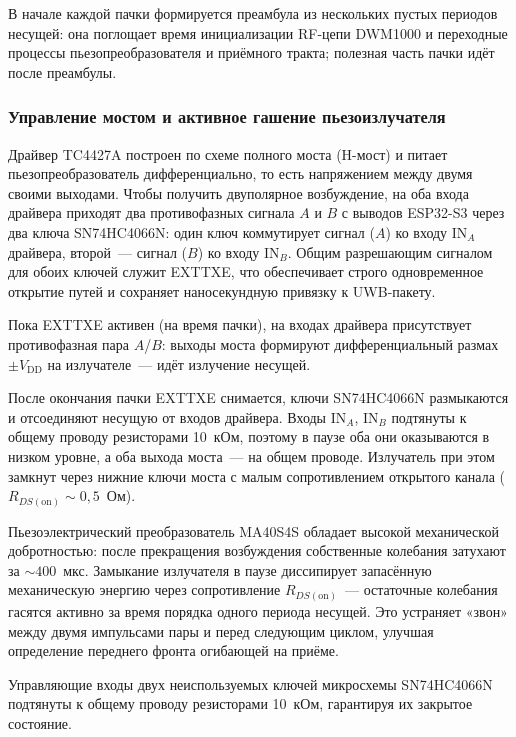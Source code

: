 В начале каждой пачки формируется преамбула из нескольких пустых периодов несущей:
она поглощает время инициализации RF-цепи DWM1000 и переходные процессы
пьезопреобразователя и приёмного тракта; полезная часть пачки идёт после преамбулы.

\subsubsection{Управление мостом и активное гашение пьезоизлучателя}

Драйвер TC4427A построен по схеме полного моста (H-мост) и питает пьезопреобразователь
дифференциально, то есть напряжением между двумя своими выходами. Чтобы получить
двуполярное возбуждение, на оба входа драйвера приходят два противофазных сигнала $A$ и $B$
с выводов ESP32-S3 через два ключа SN74HC4066N: один ключ коммутирует сигнал ($A$) ко входу
$\text{IN}_A$ драйвера, второй~--- сигнал ($B$) ко входу $\text{IN}_B$. Общим разрешающим
сигналом для обоих ключей служит EXTTXE, что обеспечивает строго одновременное открытие
путей и сохраняет наносекундную привязку к UWB-пакету.

Пока EXTTXE активен (на время пачки), на входах драйвера присутствует противофазная пара
$A$/$B$: выходы моста формируют дифференциальный размах ${\pm}V_\text{DD}$ на излучателе~---
идёт излучение несущей.

После окончания пачки EXTTXE снимается, ключи SN74HC4066N размыкаются и отсоединяют несущую
от входов драйвера. Входы $\text{IN}_A$, $\text{IN}_B$ подтянуты к общему проводу резисторами
10~кОм, поэтому в паузе оба они оказываются в низком уровне, а оба выхода моста~--- на общем
проводе. Излучатель при этом замкнут через нижние ключи моста с малым сопротивлением
открытого канала ($R_{DS(\text{on})} \sim 0{,}5$~Ом).

Пьезоэлектрический преобразователь MA40S4S обладает высокой механической добротностью:
после прекращения возбуждения собственные колебания затухают за ${\sim}400$~мкс. Замыкание
излучателя в паузе диссипирует запасённую механическую энергию через сопротивление
$R_{DS(\text{on})}$~--- остаточные колебания гасятся активно за время порядка одного периода
несущей. Это устраняет «звон» между двумя импульсами пары и перед следующим циклом,
улучшая определение переднего фронта огибающей на приёме.

Управляющие входы двух неиспользуемых ключей микросхемы SN74HC4066N подтянуты к общему
проводу резисторами 10~кОм, гарантируя их закрытое состояние.

